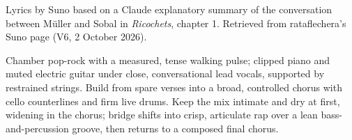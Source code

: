 
\begin{notes}
Lyrics by Suno based on a Claude explanatory summary of the conversation between Müller and Sobal in \emph{Ricochets}, chapter 1. Retrieved from rataflechera’s Suno page (V6, 2 October 2026).
\end{notes}
\begin{style}
Chamber pop-rock with a measured, tense walking pulse; clipped piano and muted electric guitar under close, conversational lead vocals, supported by restrained strings. Build from spare verses into a broad, controlled chorus with cello counterlines and firm live drums. Keep the mix intimate and dry at first, widening in the chorus; bridge shifts into crisp, articulate rap over a lean bass-and-percussion groove, then returns to a composed final chorus.
\end{style}
